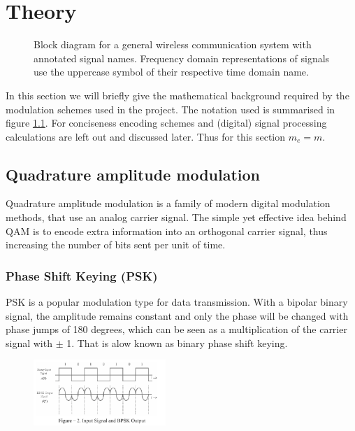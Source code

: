 
\chapter{Theory}

\begin{figure}
	\centering
	
	\caption{
		Block diagram for a general wireless communication system with annotated signal names. Frequency domain representations of signals use the uppercase symbol of their respective time domain name.
		\label{fig:notation}
	}
\end{figure}

In this section we will briefly give the mathematical background required by the modulation schemes used in the project. The notation used is summarised in figure \ref{fig:notation}. For conciseness encoding schemes and (digital) signal processing calculations are left out and discussed later. Thus for this section \(m_e = m\).

\section{Quadrature amplitude modulation}

Quadrature amplitude modulation is a family of modern digital modulation methods, that use an analog carrier signal. The simple yet effective idea behind QAM is to encode extra information into an orthogonal carrier signal, thus increasing the number of bits sent per unit of time.

\begin{figure}
	\centering
	
	\caption{
		\label{fig:qpks-constellation}
	}
\end{figure}

\subsection{Phase Shift Keying (PSK)}

PSK is a popular modulation type for data transmission\cite{Meyer2011}. With a bipolar binary signal, the amplitude remains constant and only the phase will be changed with phase jumps of 180 degrees, which can be seen as a multiplication of the carrier signal with $\pm$ 1. That is alow known as binary phase shift keying.

\begin{figure}
	\includegraphics[width=5cm]{./image/BPSK2.png}
\end{figure}

